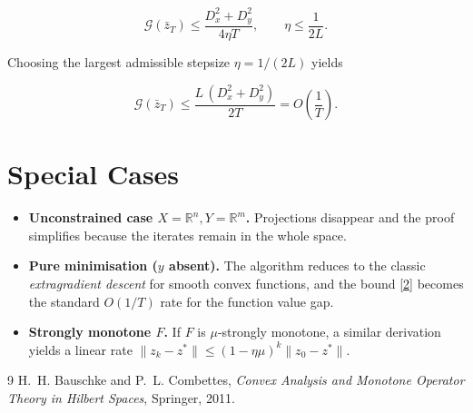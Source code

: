 \documentclass{article}
\newcommand{\gap}{\mathcal{G}}
\newcommand{\R}{\mathbb{R}}
\begin{document}
\[
\gap(\bar z_{T})\le
\frac{D_{x}^{2}+D_{y}^{2}}{4\eta T},\qquad
\eta\le\frac{1}{2L}.
\]

Choosing the largest admissible stepsize $\eta=1/(2L)$ yields  

\[
\gap(\bar z_{T})\le\frac{L\,(D_{x}^{2}+D_{y}^{2})}{2T}=O\!\left(\frac{1}{T}\right).
\]

\section*{Special Cases}
\begin{itemize}
\item \textbf{Unconstrained case $X=\R^{n},Y=\R^{m}$.}  
Projections disappear and the proof simplifies because the iterates remain in the whole space.
\item \textbf{Pure minimisation ($y$ absent).}  
The algorithm reduces to the classic \emph{extragradient descent} for smooth convex functions, and the bound \eqref{2} becomes the standard $O(1/T)$ rate for the function value gap.
\item \textbf{Strongly monotone $F$.}  
If $F$ is $\mu$‑strongly monotone, a similar derivation yields a linear rate
$\|z_{k}-z^{*}\|\le (1-\eta\mu)^{k}\|z_{0}-z^{*}\|$.
\end{itemize}

\begin{thebibliography}{9}
H.~H. Bauschke and P.~L. Combettes,
\emph{Convex Analysis and Monotone Operator Theory in Hilbert Spaces},
Springer, 2011.
\end{thebibliography}
\end{document}

